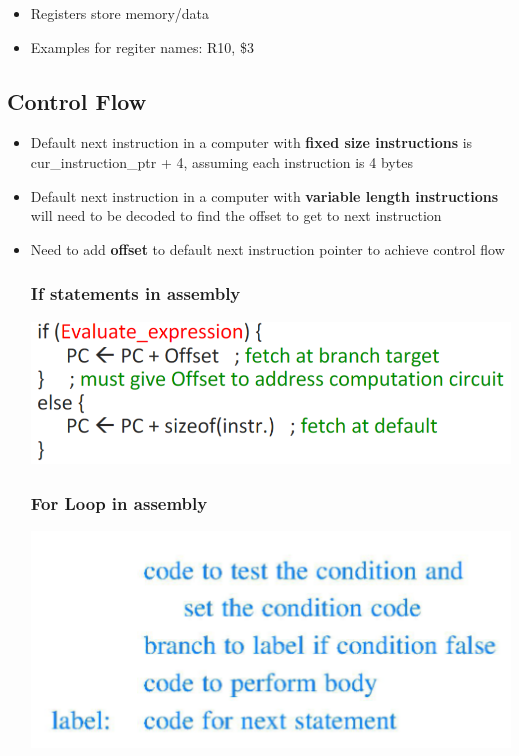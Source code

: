 \documentclass{article}
\begin{document}
\begin{itemize}
    \item Registers store memory/data
    \item Examples for regiter names: R10, \$3 
\end{itemize}

\subsection{Control Flow}
\begin{itemize}

\item Default next instruction in a computer with \textbf{fixed size instructions} is cur\_instruction\_ptr + 4, assuming each instruction is 4 bytes

\item Default next instruction in a computer with \textbf{variable length instructions} will need to be decoded to find the offset to get to next instruction 


    \item Need to add \textbf{offset} to default next instruction pointer to achieve control flow
    
    \subsubsection{If statements in assembly}
    
    \includegraphics[scale=0.35]{images/slide1.png}
 
 \subsubsection{For Loop in assembly}
    
    \includegraphics[scale=0.4]{images/if.png}
    

\end{itemize}
\end{document}

